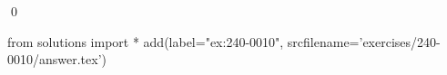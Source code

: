 
\begin{ex} 
  \label{ex:240-0010}
  
  \qed
\end{ex} 
\begin{python0}
from solutions import *
add(label="ex:240-0010",
    srcfilename='exercises/240-0010/answer.tex') 
\end{python0}
